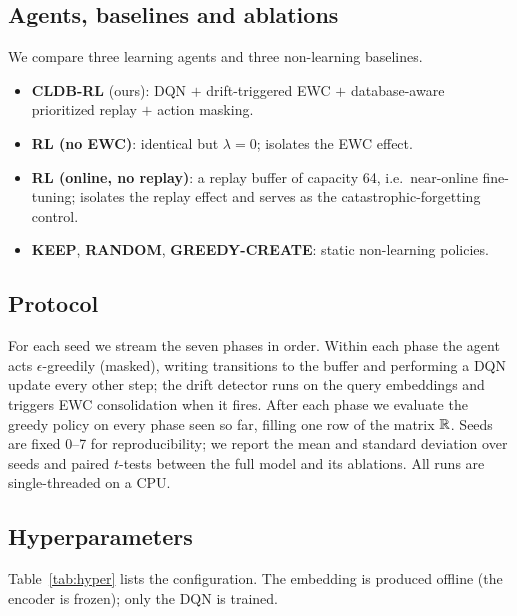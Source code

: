 \subsection{Agents, baselines and ablations}
We compare three learning agents and three non-learning baselines.
\begin{itemize}
  \item \textbf{CLDB-RL} (ours): DQN $+$ drift-triggered EWC $+$
    database-aware prioritized replay $+$ action masking.
  \item \textbf{RL (no EWC)}: identical but $\lambda=0$; isolates the EWC effect.
  \item \textbf{RL (online, no replay)}: a replay buffer of capacity 64, i.e.\
    near-online fine-tuning; isolates the replay effect and serves as the
    catastrophic-forgetting control.
  \item \textbf{KEEP}, \textbf{RANDOM}, \textbf{GREEDY-CREATE}: static
    non-learning policies.
\end{itemize}

\subsection{Protocol}
For each seed we stream the seven phases in order. Within each phase the agent
acts \(\epsilon\)-greedily (masked), writing transitions to the buffer and
performing a DQN update every other step; the drift detector runs on the query
embeddings and triggers EWC consolidation when it fires. After each phase we
evaluate the greedy policy on every phase seen so far, filling one row of the
matrix \(\mathbb{R}\). Seeds are fixed 0--7 for reproducibility; we report the mean and
standard deviation over seeds and paired $t$-tests between the full model and
its ablations. All runs are single-threaded on a CPU.

\subsection{Hyperparameters}
Table~\ref{tab:hyper} lists the configuration. The embedding is produced offline
(the encoder is frozen); only the DQN is trained.

